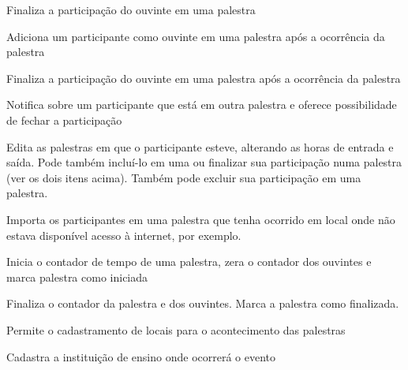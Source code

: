 \documentclass[12pt,a4paper]{article}
\begin{document}
				{Finaliza a participação do ouvinte em uma palestra}
				{%
				
				}
				
				{Adiciona um participante como ouvinte em uma palestra após a ocorrência da palestra}
				{%
				
				}
				
				{Finaliza a participação do ouvinte em uma palestra após a ocorrência da palestra}
				{%
				
				}
				
				{Notifica sobre um participante que está em outra palestra e oferece possibilidade de fechar a participação}
				{%
				
				}
				
				{Edita as palestras em que o participante esteve, alterando as horas de entrada e saída. Pode também incluí-lo em uma ou finalizar sua participação numa palestra (ver os dois itens acima). Também pode excluir sua participação em uma palestra.}
				{%
				
				}
							
				
				{Importa os participantes em uma palestra que tenha ocorrido em local onde não estava disponível acesso à internet, por exemplo.}
				{%
				
				}
				
				{Inicia o contador de tempo de uma palestra, zera o contador dos ouvintes e marca palestra como iniciada}
				{%
				
				}
				
				{Finaliza o contador da palestra e dos ouvintes. Marca a palestra como finalizada.}
				{%
				
				}
				
				
				
				{Permite o cadastramento de locais para o acontecimento das palestras}
				{%
				
				}
				
				{Cadastra a instituição de ensino onde ocorrerá o evento}
				{%
				
				}
						
\end{document}
